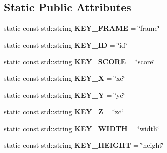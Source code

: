 \subsection*{Static Public Attributes}
\begin{DoxyCompactItemize}
\item 
static const std\+::string {\bfseries K\+E\+Y\+\_\+\+F\+R\+A\+ME} = \char`\"{}frame\char`\"{}\hypertarget{classutil_1_1Parser_a9fd08e7f29329a2d5b67e466f6f561ea}{}\label{classutil_1_1Parser_a9fd08e7f29329a2d5b67e466f6f561ea}

\item 
static const std\+::string {\bfseries K\+E\+Y\+\_\+\+ID} = \char`\"{}id\char`\"{}\hypertarget{classutil_1_1Parser_a82822b70cb89a7d402c8ebfbbc656047}{}\label{classutil_1_1Parser_a82822b70cb89a7d402c8ebfbbc656047}

\item 
static const std\+::string {\bfseries K\+E\+Y\+\_\+\+S\+C\+O\+RE} = \char`\"{}score\char`\"{}\hypertarget{classutil_1_1Parser_aea01dc9348cb59860fb279b716d3cf72}{}\label{classutil_1_1Parser_aea01dc9348cb59860fb279b716d3cf72}

\item 
static const std\+::string {\bfseries K\+E\+Y\+\_\+X} = \char`\"{}xc\char`\"{}\hypertarget{classutil_1_1Parser_a67cac8af9b52947d6984d64a56ac4ad3}{}\label{classutil_1_1Parser_a67cac8af9b52947d6984d64a56ac4ad3}

\item 
static const std\+::string {\bfseries K\+E\+Y\+\_\+Y} = \char`\"{}yc\char`\"{}\hypertarget{classutil_1_1Parser_aa13293b6680f1bec5532247c14acf85f}{}\label{classutil_1_1Parser_aa13293b6680f1bec5532247c14acf85f}

\item 
static const std\+::string {\bfseries K\+E\+Y\+\_\+Z} = \char`\"{}zc\char`\"{}\hypertarget{classutil_1_1Parser_a33c7c6efa60e5881ebf497851b56b493}{}\label{classutil_1_1Parser_a33c7c6efa60e5881ebf497851b56b493}

\item 
static const std\+::string {\bfseries K\+E\+Y\+\_\+\+W\+I\+D\+TH} = \char`\"{}width\char`\"{}\hypertarget{classutil_1_1Parser_af460fb066f6dede3b0e3aa0ea97ac115}{}\label{classutil_1_1Parser_af460fb066f6dede3b0e3aa0ea97ac115}

\item 
static const std\+::string {\bfseries K\+E\+Y\+\_\+\+H\+E\+I\+G\+HT} = \char`\"{}height\char`\"{}\hypertarget{classutil_1_1Parser_a819fb19f3d743320864fcc125b9c40eb}{}\label{classutil_1_1Parser_a819fb19f3d743320864fcc125b9c40eb}


\end{DoxyCompactItemize}
